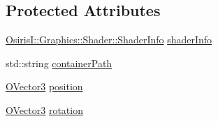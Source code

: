 \subsection*{Protected Attributes}
\begin{DoxyCompactItemize}
\item 
\hyperlink{struct_osiris_i_1_1_graphics_1_1_shader_1_1_shader_info}{Osiris\-I\-::\-Graphics\-::\-Shader\-::\-Shader\-Info} \hyperlink{class_osiris_i_1_1_graphics_1_1_actors_1_1_i_mesh_a372e7bb6ba6156e2aaad031338440ad1}{shader\-Info}
\item 
std\-::string \hyperlink{class_osiris_i_1_1_graphics_1_1_actors_1_1_i_mesh_aa83474f32b1b5b8915b6deef16d93c0a}{container\-Path}
\item 
\hyperlink{struct_osiris_i_1_1_o_vector3}{O\-Vector3} \hyperlink{class_osiris_i_1_1_graphics_1_1_actors_1_1_i_mesh_a95c7870148773aa2ccffa6c9761cc510}{position}
\item 
\hyperlink{struct_osiris_i_1_1_o_vector3}{O\-Vector3} \hyperlink{class_osiris_i_1_1_graphics_1_1_actors_1_1_i_mesh_a14ba64505fafd000597e878acaf0dcc5}{rotation}
\end{DoxyCompactItemize}


